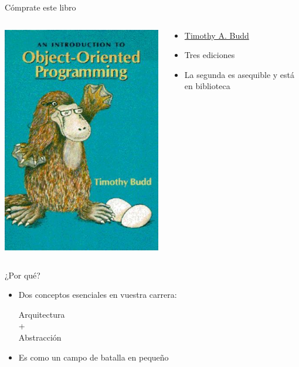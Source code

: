 \documentclass[14pt]{beamer}
\begin{document}
\begin{frame}{Cómprate este libro}
  \begin{columns}
    \begin{column}{0.5\linewidth}
      \begin{center}
        \includegraphics[height=0.8\textheight]{budd}
      \end{center}      
    \end{column}
    \begin{column}{0.5\linewidth}
      \begin{itemize}
      \item \href{http://web.engr.oregonstate.edu/~budd/}{Timothy A. Budd}
      \item Tres ediciones
      \item La segunda es asequible y está en biblioteca
      \end{itemize}
    \end{column}
  \end{columns}
\end{frame}

\begin{frame}{¿Por qué?}
  \begin{itemize}
  \item Dos conceptos esenciales en vuestra carrera:
    \begin{center}
      \larger
      \alert{Arquitectura}\\
      +\\
      \alert{Abstracción}\\
    \end{center}
    \pause
  \item Es como un \alert{campo de batalla en pequeño}
  \end{itemize}
\end{frame}
    
\end{document}

